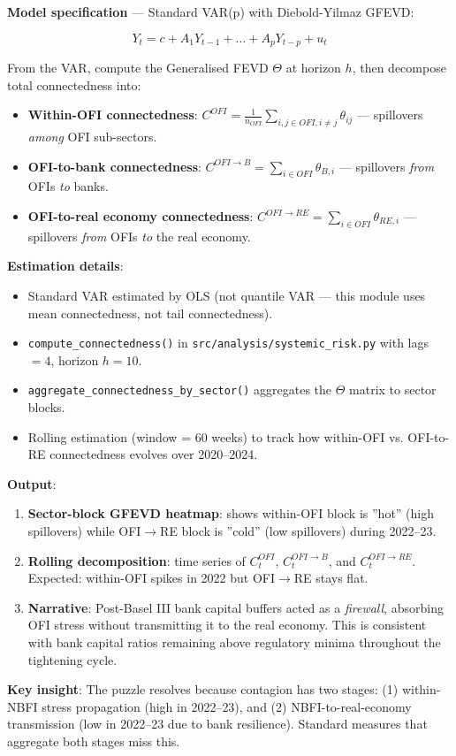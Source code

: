 \documentclass[11pt,a4paper]{article}
\begin{document}
\textbf{Model specification} --- Standard VAR(p) with Diebold-Yilmaz GFEVD:

\[Y_t = c + A_1 Y_{t-1} + \ldots + A_p Y_{t-p} + u_t\]

From the VAR, compute the Generalised FEVD $\Theta$ at horizon $h$, then decompose total connectedness into:

\begin{itemize}
\item \textbf{Within-OFI connectedness}: $C^{OFI} = \frac{1}{n_{OFI}} \sum_{i,j \in OFI, i \neq j} \theta_{ij}$ --- spillovers \textit{among} OFI sub-sectors.
\item \textbf{OFI-to-bank connectedness}: $C^{OFI \to B} = \sum_{i \in OFI} \theta_{B,i}$ --- spillovers \textit{from} OFIs \textit{to} banks.
\item \textbf{OFI-to-real economy connectedness}: $C^{OFI \to RE} = \sum_{i \in OFI} \theta_{RE,i}$ --- spillovers \textit{from} OFIs \textit{to} the real economy.

\end{itemize}
\textbf{Estimation details}:
\begin{itemize}
\item Standard VAR estimated by OLS (not quantile VAR --- this module uses mean connectedness, not tail connectedness).
\item \texttt{compute\_connectedness()} in \texttt{src/analysis/systemic\_risk.py} with lags $= 4$, horizon $h = 10$.
\item \texttt{aggregate\_connectedness\_by\_sector()} aggregates the $\Theta$ matrix to sector blocks.
\item Rolling estimation (window = 60 weeks) to track how within-OFI vs. OFI-to-RE connectedness evolves over 2020--2024.

\end{itemize}
\textbf{Output}:
\begin{enumerate}
\item \textbf{Sector-block GFEVD heatmap}: shows within-OFI block is ''hot'' (high spillovers) while OFI$\rightarrow$RE block is ''cold'' (low spillovers) during 2022--23.
\item \textbf{Rolling decomposition}: time series of $C^{OFI}_t$, $C^{OFI \to B}_t$, and $C^{OFI \to RE}_t$. Expected: within-OFI spikes in 2022 but OFI$\rightarrow$RE stays flat.
\item \textbf{Narrative}: Post-Basel III bank capital buffers acted as a \textit{firewall}, absorbing OFI stress without transmitting it to the real economy. This is consistent with bank capital ratios remaining above regulatory minima throughout the tightening cycle.

\end{enumerate}
\textbf{Key insight}: The puzzle resolves because contagion has two stages: (1) within-NBFI stress propagation (high in 2022--23), and (2) NBFI-to-real-economy transmission (low in 2022--23 due to bank resilience). Standard measures that aggregate both stages miss this.
\end{document}
